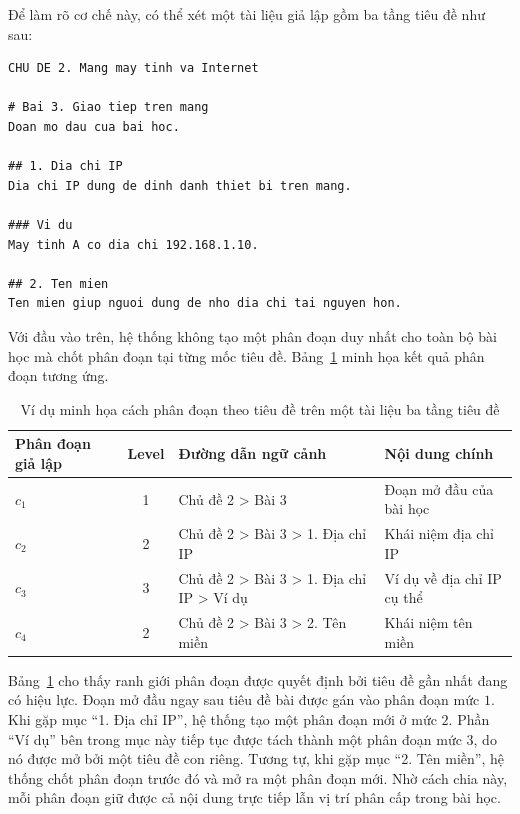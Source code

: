 \documentclass[../DoAn.tex]{subfiles}
\begin{document}
Để làm rõ cơ chế này, có thể xét một tài liệu giả lập gồm ba tầng tiêu đề như sau:

\begin{lstlisting}[basicstyle=\ttfamily\small,breaklines=true]
CHU DE 2. Mang may tinh va Internet

# Bai 3. Giao tiep tren mang
Doan mo dau cua bai hoc.

## 1. Dia chi IP
Dia chi IP dung de dinh danh thiet bi tren mang.

### Vi du
May tinh A co dia chi 192.168.1.10.

## 2. Ten mien
Ten mien giup nguoi dung de nho dia chi tai nguyen hon.
\end{lstlisting}

Với đầu vào trên, hệ thống không tạo một phân đoạn duy nhất cho toàn bộ bài học mà chốt phân đoạn tại từng mốc tiêu đề. Bảng~\ref{tab:chunking-prototype} minh họa kết quả phân đoạn tương ứng.

\begin{table}[!htbp]
\centering
\small
\begin{tabular}{|l|c|p{}|p{}|}
\hline
\textbf{Phân đoạn giả lập} & \textbf{Level} & \textbf{Đường dẫn ngữ cảnh} & \textbf{Nội dung chính} \\
\hline
$c_1$ & 1 & Chủ đề 2 > Bài 3 & Đoạn mở đầu của bài học \\
\hline
$c_2$ & 2 & Chủ đề 2 > Bài 3 > 1. Địa chỉ IP & Khái niệm địa chỉ IP \\
\hline
$c_3$ & 3 & Chủ đề 2 > Bài 3 > 1. Địa chỉ IP > Ví dụ & Ví dụ về địa chỉ IP cụ thể \\
\hline
$c_4$ & 2 & Chủ đề 2 > Bài 3 > 2. Tên miền & Khái niệm tên miền \\
\hline
\end{tabular}
\caption{Ví dụ minh họa cách phân đoạn theo tiêu đề trên một tài liệu ba tầng tiêu đề}
\label{tab:chunking-prototype}
\end{table}

Bảng~\ref{tab:chunking-prototype} cho thấy ranh giới phân đoạn được quyết định bởi tiêu đề gần nhất đang có hiệu lực. Đoạn mở đầu ngay sau tiêu đề bài được gán vào phân đoạn mức $1$. Khi gặp mục ``1. Địa chỉ IP'', hệ thống tạo một phân đoạn mới ở mức $2$. Phần ``Ví dụ'' bên trong mục này tiếp tục được tách thành một phân đoạn mức $3$, do nó được mở bởi một tiêu đề con riêng. Tương tự, khi gặp mục ``2. Tên miền'', hệ thống chốt phân đoạn trước đó và mở ra một phân đoạn mới. Nhờ cách chia này, mỗi phân đoạn giữ được cả nội dung trực tiếp lẫn vị trí phân cấp trong bài học.
\end{document}
